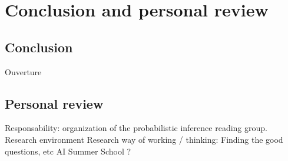 \chapter{Conclusion and personal review}

\section{Conclusion}
Ouverture

\section{Personal review}
Responsability: organization of the probabilistic inference reading group.
Research environment
Research way of working / thinking: Finding the good questions, etc
AI Summer School ?